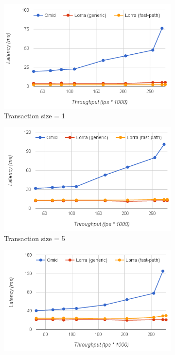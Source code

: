 \begin{figure}
  \centering
  \begin{subfigure}[t]{0.33\textwidth}
	\includegraphics[width=\textwidth]{figs/thpt-latency-1.png}
	\caption[]{Transaction size = 1}
         \label{fig:tl-1}
  \end{subfigure}
  \begin{subfigure}[t]{0.33\textwidth}
	\includegraphics[width=\textwidth]{figs/thpt-latency-5.png}
	\caption[]{Transaction size = 5}
    \label{fig:tl-5}
  \end{subfigure}
    \begin{subfigure}[t]{0.33\textwidth}
	\includegraphics[width=\textwidth]{figs/thpt-latency-10.png}

\end{subfigure}
\end{figure}
